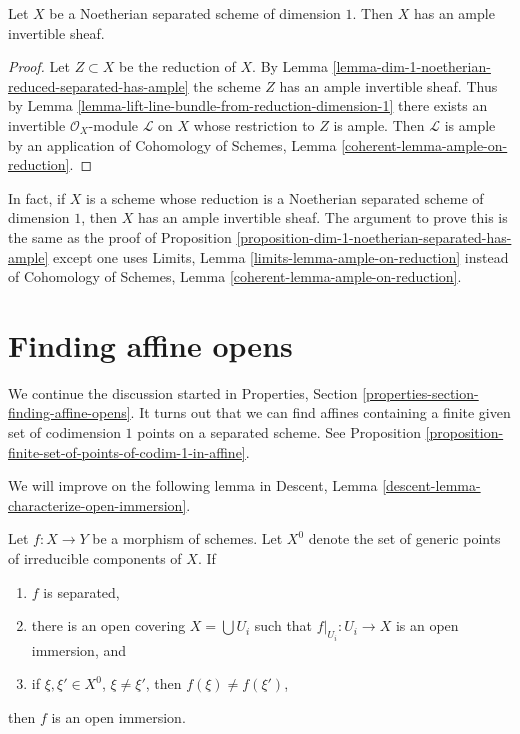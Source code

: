 \begin{proposition}
\label{proposition-dim-1-noetherian-separated-has-ample}
Let $X$ be a Noetherian separated scheme of dimension $1$.
Then $X$ has an ample invertible sheaf.
\end{proposition}

\begin{proof}
Let $Z \subset X$ be the reduction of $X$. By
Lemma \ref{lemma-dim-1-noetherian-reduced-separated-has-ample}
the scheme $Z$ has an ample invertible sheaf.
Thus by Lemma \ref{lemma-lift-line-bundle-from-reduction-dimension-1}
there exists an invertible $\mathcal{O}_X$-module $\mathcal{L}$
on $X$ whose restriction to $Z$ is ample.
Then $\mathcal{L}$ is ample by an application of
Cohomology of Schemes, Lemma \ref{coherent-lemma-ample-on-reduction}.
\end{proof}

\begin{remark}
\label{remark-useless-generalization}
In fact, if $X$ is a scheme whose reduction is a Noetherian
separated scheme of dimension $1$, then $X$ has an ample invertible
sheaf. The argument to prove this is the same as the proof of
Proposition \ref{proposition-dim-1-noetherian-separated-has-ample}
except one uses
Limits, Lemma \ref{limits-lemma-ample-on-reduction}
instead of
Cohomology of Schemes, Lemma \ref{coherent-lemma-ample-on-reduction}.
\end{remark}















\section{Finding affine opens}
\label{section-finding-affine-opens}

\noindent
We continue the discussion started in
Properties, Section \ref{properties-section-finding-affine-opens}.
It turns out that we can find affines containing a finite given set
of codimension $1$ points on a separated scheme. See
Proposition \ref{proposition-finite-set-of-points-of-codim-1-in-affine}.

\medskip\noindent
We will improve on the following lemma in
Descent, Lemma \ref{descent-lemma-characterize-open-immersion}.

\begin{lemma}
\label{lemma-characterize-open-immersion}
Let $f : X \to Y$ be a morphism of schemes. Let $X^0$ denote the set
of generic points of irreducible components of $X$. If
\begin{enumerate}
\item $f$ is separated,
\item there is an open covering $X = \bigcup U_i$ such that
$f|_{U_i} : U_i \to X$ is an open immersion, and
\item if $\xi, \xi' \in X^0$, $\xi \not = \xi'$, then $f(\xi) \not = f(\xi')$,
\end{enumerate}
then $f$ is an open immersion.
\end{lemma}

